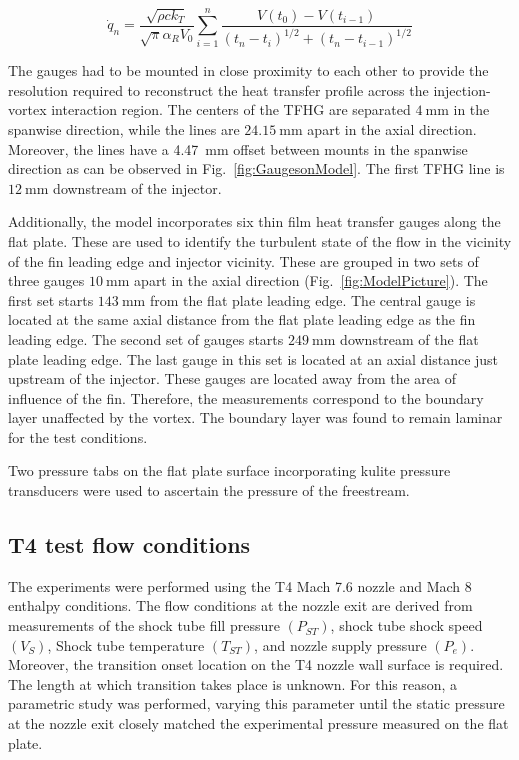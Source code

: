 \documentclass{AIAA}
\begin{document}
\begin{equation}
\dot{q}_n = \frac{\sqrt{\rho c k_T}}{\sqrt{\pi}\alpha_R V_0}\sum^n_{i=1}\frac{V\left(t_0\right)-V\left(t_{i-1}\right)}{\left(t_n-t_i\right)^{1/2}+\left(t_n-t_{i-1}\right)^{1/2}}
\label{eq:TFHG_Heat} 
\end{equation}


  The gauges had to be mounted in close proximity to each other to provide the resolution required to reconstruct the heat transfer profile across the injection-vortex interaction region. The centers of the TFHG are separated $\SI{4}{\milli\meter}$ in the spanwise direction, while the lines are $\SI{24.15}{\milli\meter}$ apart in the axial direction. Moreover, the lines have a \SI{4.47}{\milli\meter} offset between mounts in the spanwise direction as can be observed in Fig.~\ref{fig:GaugesonModel}. The first TFHG line is $\SI{12}{\milli\meter}$ downstream of the injector.

Additionally, the model incorporates six thin film heat transfer gauges along the flat plate. These are used to identify the turbulent state of the flow in the vicinity of the fin leading edge and injector vicinity. These are grouped in two sets of three gauges $\SI{10}{\milli\meter}$ apart in the axial direction (Fig.~\ref{fig:ModelPicture}). The first set starts $\SI{143}{\milli\meter}$ from the flat plate leading edge. The central gauge is located at the same axial distance from the flat plate leading edge as the fin leading edge. The second set of gauges starts $\SI{249}{\milli\meter}$ downstream of the flat plate leading edge. The last gauge in this set is located at an axial distance just upstream of the injector. These gauges are located away from the area of influence of the fin. Therefore, the measurements correspond to the boundary layer unaffected by the vortex. The boundary layer was found to remain laminar for the test conditions.

Two pressure tabs on the flat plate surface incorporating kulite pressure transducers were used to ascertain the pressure of the freestream.


\subsection{T4 test flow conditions}

The experiments were performed using the T4 Mach 7.6 nozzle and Mach 8 enthalpy conditions. The flow conditions at the nozzle exit are derived from measurements of the shock tube fill pressure $\left(P_{ST}\right)$, shock tube shock speed $\left(V_{S}\right)$, Shock tube temperature $\left(T_{ST}\right)$, and nozzle supply pressure $\left(P_e\right)$.
Moreover, the transition onset location on the T4 nozzle wall surface is required. The length at which transition takes place is unknown. For this reason, a parametric study was performed, varying this parameter until the static pressure at the nozzle exit closely matched the experimental pressure measured on the flat plate.
\end{document}
